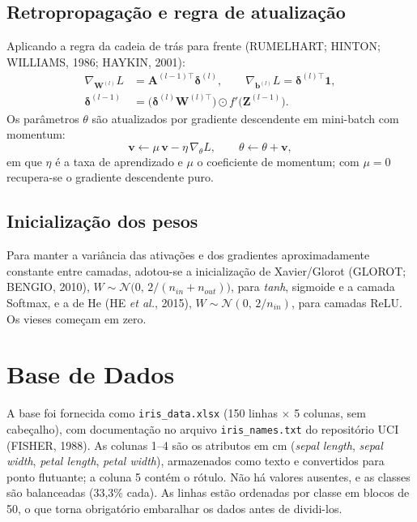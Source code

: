 \documentclass[12pt,a4paper]{article}
\begin{document}
\subsection{Retropropagação e regra de atualização}

Aplicando a regra da cadeia de trás para frente (RUMELHART; HINTON; WILLIAMS, 1986; HAYKIN, 2001):
\begin{align}
  \nabla_{\mathbf{W}^{(l)}}L &= \mathbf{A}^{(l-1)\top}\boldsymbol{\delta}^{(l)}, \qquad
  \nabla_{\mathbf{b}^{(l)}}L = \boldsymbol{\delta}^{(l)\top}\mathbf{1}, \label{eq:gradW}\\
  \boldsymbol{\delta}^{(l-1)} &= \big(\boldsymbol{\delta}^{(l)}\mathbf{W}^{(l)\top}\big)\odot
  f'\big(\mathbf{Z}^{(l-1)}\big). \label{eq:delta}
\end{align}
Os parâmetros $\theta$ são atualizados por gradiente descendente em mini-batch com momentum:
\begin{equation}
  \mathbf{v}\leftarrow\mu\,\mathbf{v}-\eta\,\nabla_{\theta}L,\qquad
  \theta\leftarrow\theta+\mathbf{v}, \label{eq:momentum}
\end{equation}
em que $\eta$ é a taxa de aprendizado e $\mu$ o coeficiente de momentum; com $\mu=0$ recupera-se o
gradiente descendente puro.

\subsection{Inicialização dos pesos}

Para manter a variância das ativações e dos gradientes aproximadamente constante entre camadas,
adotou-se a inicialização de Xavier/Glorot (GLOROT; BENGIO, 2010), $W\sim\mathcal{N}\big(0,\,2/(n_{in}+n_{out})\big)$,
para \textit{tanh}, sigmoide e a camada Softmax, e a de He (HE \textit{et al.}, 2015), $W\sim\mathcal{N}(0,\,2/n_{in})$,
para camadas ReLU. Os vieses começam em zero.

\section{Base de Dados}
\label{sec:dados}

A base foi fornecida como \texttt{iris\_data.xlsx} (150 linhas $\times$ 5 colunas, sem cabeçalho),
com documentação no arquivo \texttt{iris\_names.txt} do repositório UCI (FISHER, 1988). As colunas 1--4
são os atributos em cm (\textit{sepal length}, \textit{sepal width}, \textit{petal length},
\textit{petal width}), armazenados como texto e convertidos para ponto flutuante; a coluna 5 contém
o rótulo. Não há valores ausentes, e as classes são balanceadas (33,3\% cada). As linhas estão
ordenadas por classe em blocos de 50, o que torna obrigatório embaralhar os dados antes de dividi-los.
\end{document}
